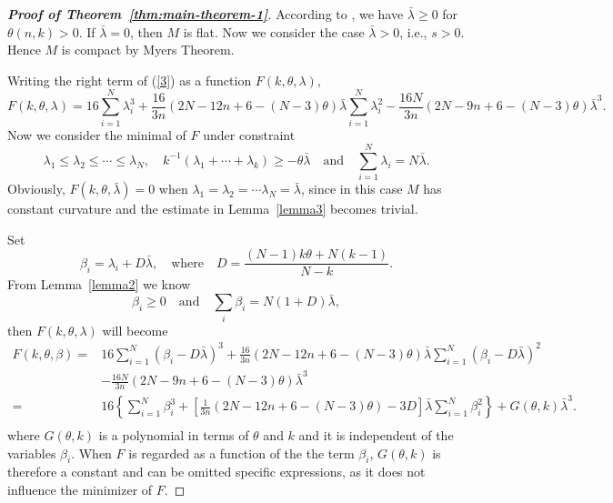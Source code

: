 \documentclass[11pt, reqno]{amsart}
\numberwithin{equation}{section}
\theoremstyle{definition}
\begin{document}
	\begin{proof}[\textbf{Proof of Theorem~\ref{thm:main-theorem-1}}]According to \cite[Proposition 2.8]{Li5}, we have  $\bar{\lambda}\geq0$ for $\theta(n,k)>0$. If $\bar{\lambda}=0$, then $M$ is flat. Now we consider the case $\bar{\lambda}> 0$, i.e., $s>0$. Hence $M$ is compact by Myers Theorem.
		
		Writing the right term of (\ref{3}) as a function $F(k,\theta ,\lambda )$, 
		$$F(k,\theta ,\lambda )=16\sum\limits_{i=1}^{N}{\lambda _{i}^{3}}+\frac{16}{3n}(2N-12n+6-(N-3)\theta )\bar{\lambda }\sum\limits_{i=1}^{N}{\lambda _{i}^2} -\frac{16N}{3n}(2N-9n+6-(N-3)\theta )\bar{\lambda }^3.$$
		Now we consider the minimal of $F$ under constraint \[{\lambda }_1\le {\lambda }_2\le \cdots \le {\lambda }_N,\quad k^{-1}({\lambda }_1+\cdots +{\lambda }_k)\ge -\theta \bar{\lambda } \quad\text{and}\quad \sum\limits_{i=1}^{N}{{\lambda }_i}=N\bar{\lambda }.\]
		Obviously, $F(k,\theta ,\bar{\lambda})=0$ when ${\lambda }_1= {\lambda }_2= \cdots  {\lambda }_N=\bar{\lambda}$, since in this case $M$ has constant curvature and the estimate in Lemma~\ref{lemma3} becomes trivial.
		
		Set
		$${\beta }_i={\lambda }_i+D\bar{\lambda }, \quad\text{where}\quad D=\frac{(N-1)k\theta +N(k-1)}{N-k}.$$ 
		From Lemma~\ref{lemma2} we know 
		$${\beta }_i\ge 0 \quad\text{and}\quad \sum\limits_{i}{{\beta }_i}=N(1+D)\bar{\lambda },$$
		then $F(k,\theta ,\lambda )$ will become
		\begin{align*}
			F(k,\theta ,\beta )=&16\sum\limits_{i=1}^{N}{({\beta }_i-D\bar{\lambda })^3}+\frac{16}{3n}(2N-12n+6-(N-3)\theta )\bar{\lambda }\sum\limits_{i=1}^{N}{({\beta }_i-D\bar{\lambda })^2} \\ 
			& -\frac{16N}{3n}(2N-9n+6-(N-3)\theta){\bar{\lambda }}^3 \\ 
			=&16\left\{\sum\limits_{i=1}^{N}{\beta _{i}^3}+[\frac{1}{3n}(2N-12n+6-(N-3)\theta )-3D]\bar{\lambda }\sum\limits_{i=1}^{N}{\beta _{i}^2}\right\}+G(\theta ,k){\bar{\lambda }}^3. \\ 
		\end{align*}
		where $G(\theta,k)$ is a polynomial in terms of $\theta$ and $k$ and it is independent of the variables ${\beta}_i$. When $F$ is regarded as a function of the the term 
		${\beta}_i$, $G(\theta,k)$ is therefore a constant and can be omitted specific expressions, as it does not influence the minimizer of $F$.
		

\end{proof}
\end{document}
